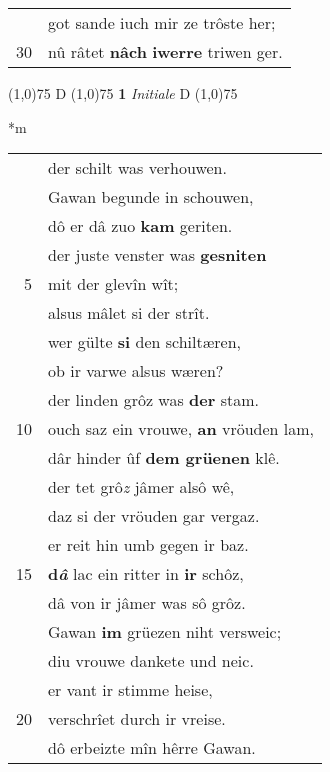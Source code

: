 \documentclass[8pt,a4paper,notitlepage]{article}
\begin{document}
\begin{table}[ht]
\begin{minipage}[t]{0.5\linewidth}
\begin{tabular}{rl}
 & got sande iuch mir ze trôste her;\\ 
30 & nû râtet \textbf{nâch} \textbf{iwerre} triwen ger.\\ 
\end{tabular}
\scriptsize
\line(1,0){75} \newline
D \newline
\line(1,0){75} \newline
\textbf{1} \textit{Initiale} D  \newline
\line(1,0){75} \newline
\newline
\end{minipage}
\hspace{0.5cm}
\begin{minipage}[t]{0.5\linewidth}
\small
\begin{center}*m
\end{center}
\begin{tabular}{rl}
 & der schilt was verhouwen.\\ 
 & Gawan begunde in schouwen,\\ 
 & dô er dâ zuo \textbf{kam} geriten.\\ 
 & der juste venster was \textbf{gesniten}\\ 
5 & mit der glevîn wît;\\ 
 & alsus mâlet si der strît.\\ 
 & wer gülte \textbf{si} den schiltæren,\\ 
 & ob ir varwe alsus wæren?\\ 
 & der linden grôz was \textbf{der} stam.\\ 
10 & ouch saz ein vrouwe, \textbf{an} vröuden lam,\\ 
 & dâr hinder ûf \textbf{dem grüenen} klê.\\ 
 & der tet grô\textit{z} jâmer alsô wê,\\ 
 & daz si der vröuden gar vergaz.\\ 
 & er reit hin umb gegen ir baz.\\ 
15 & \textbf{d\textit{â}} lac ein ritter in \textbf{ir} schôz,\\ 
 & dâ von ir jâmer was sô grôz.\\ 
 & Gawan \textbf{im} grüezen niht versweic;\\ 
 & diu vrouwe dankete und neic.\\ 
 & er vant ir stimme heise,\\ 
20 & verschrîet durch ir vreise.\\ 
 & dô erbeizte mîn hêrre Gawan.\\ 

\end{tabular}
\end{minipage}
\end{table}
\end{document}
